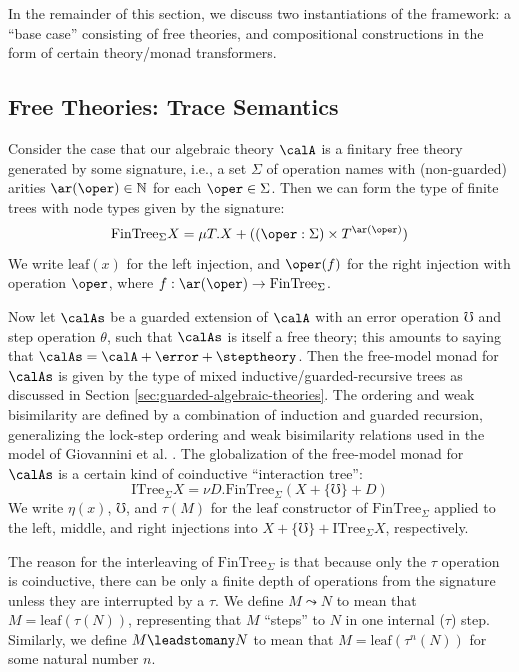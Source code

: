 \documentclass[acmsmall,screen,review,anonymous]{acmart}
\theoremstyle{remark}
\begin{document}
In the remainder of this section, we discuss two instantiations of the
framework: a ``base case'' consisting of free theories, and compositional
constructions in the form of certain theory/monad transformers.

\subsection{Free Theories: Trace Semantics}\label{sec:trace-semantics}

Consider the case that our algebraic theory $\calA$ is a finitary free theory
generated by some signature, i.e., a set $\Sigma$ of operation names with
(non-guarded) arities $\ar(\oper) \in \mathbb N$ for each $\oper \in \Sigma$. Then
we can form the type of finite trees with node types given by the signature:
%
\[ \textrm{FinTree}_\Sigma X = \mu T. X + ((\oper : \Sigma) \times T^{\ar(\oper)}) \]
%
We write $\textrm{leaf}(x)$ for the left injection, and $\oper(f)$ for the right
injection with operation $\oper$, where $f : \ar(\oper) \to
\textrm{FinTree}_\Sigma$.

Now let $\calAs$ be a guarded extension of $\calA$ with an error operation
$\mho$ and step operation $\theta$, such that $\calAs$ is itself a free theory;
this amounts to saying that $\calAs = \calA + \error + \steptheory$.
%
Then the free-model monad for $\calAs$ is given by the type of mixed
inductive/guarded-recursive trees as discussed in Section
\ref{sec:guarded-algebraic-theories}. The ordering and weak bisimilarity are
defined by a combination of induction and guarded recursion, generalizing the
lock-step ordering and weak bisimilarity relations used in the model of
Giovannini et al. \cite{gtt-sgdt}.
%
The globalization of the free-model monad for $\calAs$ is a certain
kind of coinductive ``interaction tree'':
%
\[ \textrm{ITree}_\Sigma X = \nu D. \textrm{FinTree}_\Sigma(X + \{ \mho \} + D) \]
%
We write $\eta(x)$, $\mho$, and $\tau(M)$ for the $\textrm{leaf}$ constructor of
$\textrm{FinTree}_\Sigma$ applied to the left, middle, and right injections into
$X + \{ \mho \} + \textrm{ITree}_\Sigma X$, respectively.

The reason for the interleaving of $\textrm{FinTree}_\Sigma$ is that because
only the $\tau$ operation is coinductive, there can be only a finite depth of
operations from the signature unless they are interrupted by a $\tau$. We define
$M \leadsto N$ to mean that $M = \textrm{leaf}(\tau(N))$, representing that $M$
``steps'' to $N$ in one internal ($\tau$) step. Similarly, we define $M
\leadstomany N$ to mean that $M = \textrm{leaf}(\tau^n(N))$ for some natural
number $n$.
\end{document}
